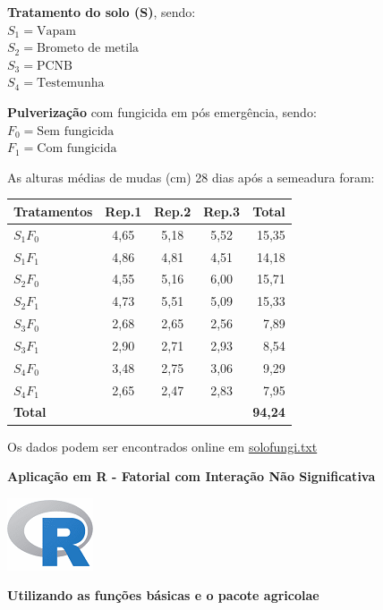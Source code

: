 \documentclass[
]{book}
\begin{document}
\textbf{Tratamento do solo (S)}, sendo:\\
\(S_1=\text{Vapam}\)\\
\(S_2=\text{Brometo de metila}\)\\
\(S_3=\text{PCNB}\)\\
\(S_4=\text{Testemunha}\)

\textbf{Pulverização} com fungicida em pós emergência, sendo:\\
\(F_0 = \text{Sem fungicida}\)\\
\(F_1 = \text{Com fungicida}\)

As alturas médias de mudas (cm) 28 dias após a semeadura foram:

\begin{longtable}[]{@{}lcccr@{}}
\toprule
Tratamentos & Rep.1 & Rep.2 & Rep.3 & Total\tabularnewline
\midrule
\endhead
\(S_1F_0\) & 4,65 & 5,18 & 5,52 & 15,35\tabularnewline
\(S_1F_1\) & 4,86 & 4,81 & 4,51 & 14,18\tabularnewline
\(S_2F_0\) & 4,55 & 5,16 & 6,00 & 15,71\tabularnewline
\(S_2F_1\) & 4,73 & 5,51 & 5,09 & 15,33\tabularnewline
\(S_3F_0\) & 2,68 & 2,65 & 2,56 & 7,89\tabularnewline
\(S_3F_1\) & 2,90 & 2,71 & 2,93 & 8,54\tabularnewline
\(S_4F_0\) & 3,48 & 2,75 & 3,06 & 9,29\tabularnewline
\(S_4F_1\) & 2,65 & 2,47 & 2,83 & 7,95\tabularnewline
\textbf{Total} & & & & \textbf{94,24}\tabularnewline
\bottomrule
\end{longtable}

Os dados podem ser encontrados online em \href{https://raw.githubusercontent.com/arpanosso/curso_GIEU/master/dados/solofungi.txt}{solofungi.txt}

\textbf{Aplicação em R - Fatorial com Interação Não Significativa}

\includegraphics{R.png}

\textbf{Utilizando as funções básicas e o pacote agricolae}
\end{document}
